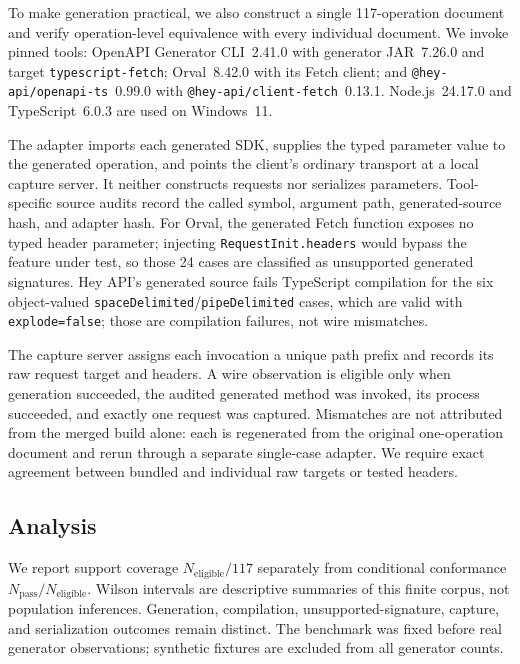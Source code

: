 \documentclass[runningheads]{llncs}
\begin{document}
To make generation practical, we also construct a single 117-operation document and verify operation-level equivalence with every individual document. We invoke pinned tools: OpenAPI Generator CLI~2.41.0 with generator JAR~7.26.0 and target \texttt{typescript-fetch}; Orval~8.42.0 with its Fetch client; and \texttt{@hey-api/openapi-ts}~0.99.0 with \texttt{@hey-api/client-fetch}~0.13.1. Node.js~24.17.0 and TypeScript~6.0.3 are used on Windows~11.

The adapter imports each generated SDK, supplies the typed parameter value to the generated operation, and points the client's ordinary transport at a local capture server. It neither constructs requests nor serializes parameters. Tool-specific source audits record the called symbol, argument path, generated-source hash, and adapter hash. For Orval, the generated Fetch function exposes no typed header parameter; injecting \texttt{RequestInit.headers} would bypass the feature under test, so those 24 cases are classified as unsupported generated signatures. Hey API's generated source fails TypeScript compilation for the six object-valued \texttt{spaceDelimited}/\texttt{pipeDelimited} cases, which are valid with \texttt{explode=false}; those are compilation failures, not wire mismatches.

The capture server assigns each invocation a unique path prefix and records its raw request target and headers. A wire observation is eligible only when generation succeeded, the audited generated method was invoked, its process succeeded, and exactly one request was captured. Mismatches are not attributed from the merged build alone: each is regenerated from the original one-operation document and rerun through a separate single-case adapter. We require exact agreement between bundled and individual raw targets or tested headers.

\subsection{Analysis}

We report support coverage $N_{\mathrm{eligible}}/117$ separately from conditional conformance $N_{\mathrm{pass}}/N_{\mathrm{eligible}}$. Wilson intervals are descriptive summaries of this finite corpus, not population inferences. Generation, compilation, unsupported-signature, capture, and serialization outcomes remain distinct. The benchmark was fixed before real generator observations; synthetic fixtures are excluded from all generator counts.
\end{document}
